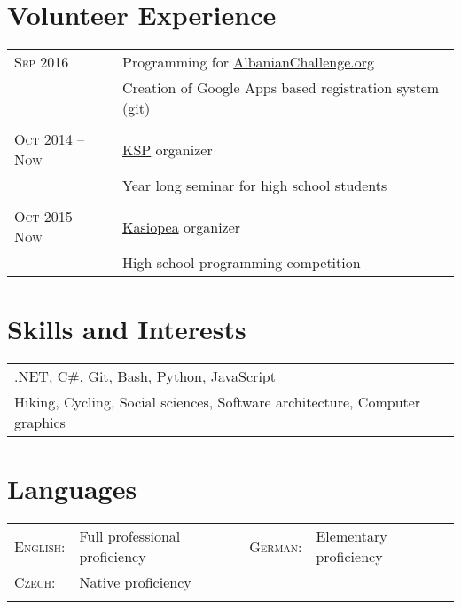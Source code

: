 \documentclass[a4paper,10pt]{article}
\newcommand{\rightcol}{11.2cm}
\newcommand{\leftcol}{2.8cm}
\begin{document}
\section{Volunteer Experience}
\begin{tabular}{p{\leftcol}|p{\rightcol}} 

\textsc{Sep 2016} & Programming for \href{http://albanianchallenge.org/}{AlbanianChallenge.org}\\
                &\footnotesize{Creation of Google Apps based registration system (\href{https://github.com/petrroll/ACRegistrationGAS}{git})}\\

\multicolumn{2}{c}{} \\

\textsc{Oct 2014 -- Now} & \href{https://ksp.mff.cuni.cz/}{KSP} organizer \\
                        &\footnotesize{Year long seminar for high school students}\\

\multicolumn{2}{c}{} \\

\textsc{Oct 2015 -- Now} & \href{https://kasiopea.matfyz.cz/}{Kasiopea} organizer \\
                        &\footnotesize{High school programming competition}\\
\end{tabular}

\section{Skills and Interests}
\begin{tabular}{l} 
.NET, C\#, Git, Bash, Python, JavaScript \\
Hiking, Cycling, Social sciences, Software architecture, Computer graphics \\
\end{tabular}

\section{Languages}
\begin{tabular}{llll}
\textsc{English:} & Full professional proficiency &
\textsc{German:} & Elementary proficiency \\
\textsc{Czech:} & Native proficiency \\&
\end{tabular}
\end{document}
